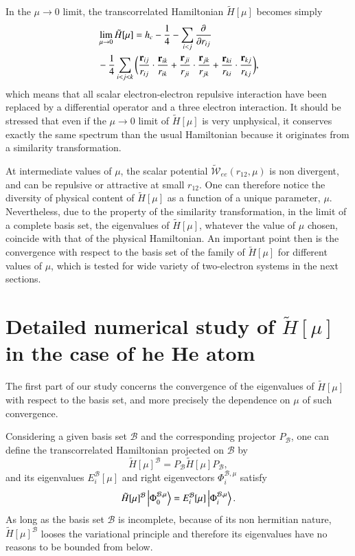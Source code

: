 \documentclass[aip,jcp,reprint,noshowkeys,superscriptaddress]{revtex4-1}
\newcommand{\deriv}[3]{\frac{\partial^{#3} #1}{\partial {#2}^{#3}}}
\newcommand{\bri}[1]{{\bf r}_{#1}}
\newcommand{\phimub}[0]{\Phi^{\mathcal{B},\mu}_0}
\newcommand{\phiimub}[0]{\Phi^{\mathcal{B},\mu}_i}
\newcommand{\basis}[0]{\mathcal{B}}
\begin{document}
In the $\mu \rightarrow 0$ limit, the transcorrelated Hamiltonian $\tilde{H}[\mu]$ becomes simply 
\begin{equation}
 \label{eq:htilde_mu_low}
 \begin{aligned}
&\lim_{\mu \rightarrow 0} \tilde{H}[\mu] = h_c - \frac{1}{4} - \sum_{i<j}\deriv{}{r_{ij}}{} \\
 & - \frac{1}{4}\sum_{i<j<k}  \bigg(\frac{\bri{ij} }{ r_{ij}} \cdot \frac{\bri{ik} }{ r_{ik}} + \frac{\bri{ji} }{ r_{ji}} \cdot \frac{\bri{jk}  }{ r_{jk}} + \frac{\bri{ki} }{ r_{ki}} \cdot  \frac{\bri{kj} }{ r_{kj}} \bigg),
 \end{aligned}
\end{equation}
which means that all scalar electron-electron repulsive interaction have been replaced by a differential operator and a three electron interaction. 
It should be stressed that even if the $\mu \rightarrow 0$ limit of $\tilde{H}[\mu]$ is very unphysical, it conserves exactly the same spectrum than the usual Hamiltonian because it originates from a similarity transformation. 

At intermediate values of $\mu$, the scalar potential $\tilde{\mathcal{W}}_{ee}(r_{12},\mu) $ is non divergent, and can be repulsive or attractive at small $r_{12}$. One can therefore notice the diversity of physical content of $\tilde{H}[\mu]$ as a function of a unique parameter, $\mu$. 
Nevertheless, due to the property of the similarity transformation, in the limit of a complete basis set, the eigenvalues of $\tilde{H}[\mu]$, whatever the value of $\mu$ chosen, coincide with that of the physical Hamiltonian. An important point then is the convergence with respect to the basis set of the family of $\tilde{H}[\mu]$ for different values of $\mu$, which is tested for wide variety of two-electron systems in the next sections. 

\section{Detailed numerical study of $\tilde{H}[\mu]$ in the case of he He atom}
The first part of our study concerns the convergence of the eigenvalues of $\tilde{H}[\mu]$ with respect to the basis set, and more precisely the dependence on $\mu$ of such convergence. 

Considering a given basis set $\basis$ and the corresponding projector $P_\basis$, one can define the transcorrelated Hamiltonian projected on $\basis$ by
\begin{equation}
 \tilde{H}[\mu]^{\basis} = P_\basis \tilde{H}[\mu] P_\basis,
\end{equation}
and its eigenvalues $E_i^{\basis}[\mu]$ and right eigenvectors $\phiimub$ satisfy 
\begin{equation}
 \tilde{H}[\mu]^{\basis} \ket{\phimub} = E_i^{\basis}[\mu] \ket{\phiimub}. 
\end{equation}
As long as the basis set $\basis$ is incomplete, because of its non hermitian nature, $\tilde{H}[\mu]^{\basis}$ looses the variational principle and therefore its eigenvalues have no reasons to be bounded from below.  
\end{document}
